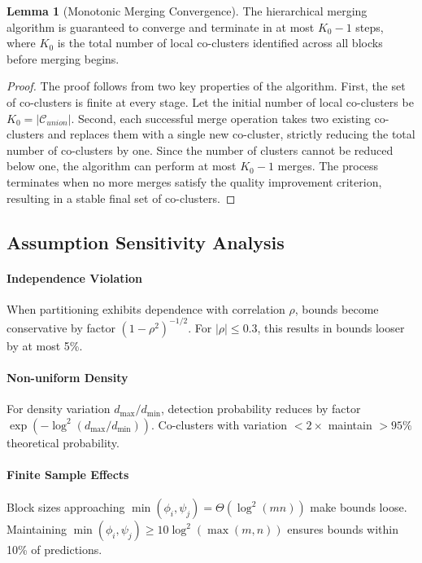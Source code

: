 \documentclass[journal]{IEEEtran}
\theoremstyle{definition}
\newtheorem{lemma}[theorem]{Lemma}
\theoremstyle{remark} %
\begin{document}
{\begin{lemma}[Monotonic Merging Convergence]
    \label{lem:merging-convergence}
    The hierarchical merging algorithm is guaranteed to converge and terminate in at most $K_0 - 1$ steps, where $K_0$ is the total number of local co-clusters identified across all blocks before merging begins.
\end{lemma}
\begin{proof}
    The proof follows from two key properties of the algorithm. First, the set of co-clusters is finite at every stage. Let the initial number of local co-clusters be $K_0 = |\mathcal{C}_{union}|$. Second, each successful merge operation takes two existing co-clusters and replaces them with a single new co-cluster, strictly reducing the total number of co-clusters by one. Since the number of clusters cannot be reduced below one, the algorithm can perform at most $K_0 - 1$ merges. The process terminates when no more merges satisfy the quality improvement criterion, resulting in a stable final set of co-clusters.
\end{proof}

\subsection{Assumption Sensitivity Analysis}
\label{subsec:sensitivity-analysis}

\paragraph{Independence Violation}{When partitioning exhibits dependence with correlation $\rho$, bounds become conservative by factor $(1-\rho^2)^{-1/2}$. For $|\rho| \leq 0.3$, this results in bounds looser by at most 5\%.}

\paragraph{Non-uniform Density}{For density variation $d_{\max}/d_{\min}$, detection probability reduces by factor $\exp(-\log^2(d_{\max}/d_{\min}))$. Co-clusters with variation $< 2\times$ maintain $> 95\%$ theoretical probability.}

\paragraph{Finite Sample Effects}{Block sizes approaching $\min(\phi_i, \psi_j) = \Theta(\log^2(mn))$ make bounds loose. Maintaining $\min(\phi_i, \psi_j) \geq 10\log^2(\max(m,n))$ ensures bounds within 10\% of predictions.}

}
\end{document}
